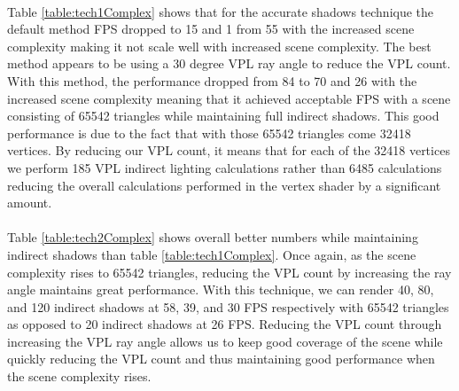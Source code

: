 \paragraph{}
Table \ref{table:tech1Complex} shows that for the accurate shadows technique the default method FPS dropped to 15 and 1 from 55 with the increased scene complexity making it not scale well with increased scene complexity.  The best method appears to be using a 30 degree VPL ray angle to reduce the VPL count.  With this method, the performance dropped from 84 to 70 and 26 with the increased scene complexity meaning that it achieved acceptable FPS with a scene consisting of 65542 triangles while maintaining full indirect shadows.  This good performance is due to the fact that with those 65542 triangles come 32418 vertices.  By reducing our VPL count, it means that for each of the 32418 vertices we perform 185 VPL indirect lighting calculations rather than 6485 calculations reducing the overall calculations performed in the vertex shader by a significant amount.

\paragraph{}
Table \ref{table:tech2Complex} shows overall better numbers while maintaining indirect shadows than table \ref{table:tech1Complex}.  Once again, as the scene complexity rises to 65542 triangles, reducing the VPL count by increasing the ray angle maintains great performance.  With this technique, we can render 40, 80, and 120 indirect shadows at 58, 39, and 30 FPS respectively with 65542 triangles as opposed to 20 indirect shadows at 26 FPS.  Reducing the VPL count through increasing the VPL ray angle allows us to keep good coverage of the scene while quickly reducing the VPL count and thus maintaining good performance when the scene complexity rises.

